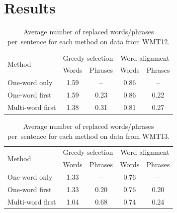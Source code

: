 \section{Results}
\label{results}

\begin{table}[t]
\begin{center}
\begin{tabular}{l|cc|cc}
\multirow{2}{*}{Method} & \multicolumn{2}{c|}{Greedy selection} & \multicolumn{2}{c}{Word alignment} \\
& Words & Phrases & Words & Phrases \\
\hline
One-word only     & 1.59 & --   & 0.86 &  --  \\
One-word first    & 1.59 & 0.23 & 0.86 & 0.22 \\
Multi-word first  & 1.38 & 0.31 & 0.81 & 0.27 \\
\end{tabular}
\caption{Average number of replaced words/phrases per~sentence for each method on data from WMT12.}
\label{replaced12}
\end{center}
\end{table}

\begin{table}[t]
\begin{center}
\begin{tabular}{l|cc|cc}
\multirow{2}{*}{Method} & \multicolumn{2}{c|}{Greedy selection} & \multicolumn{2}{c}{Word alignment} \\
& Words & Phrases & Words & Phrases \\
\hline
One-word only    & 1.33 &  --  & 0.76 & --   \\
One-word first   & 1.33 & 0.20 & 0.76 & 0.20 \\
Multi-word first & 1.04 & 0.68 & 0.74 & 0.24 \\
\end{tabular}
\caption{Average number of replaced words/phrases per~sentence for each method on data from WMT13.}
\label{replaced13}
\end{center}
\end{table}

